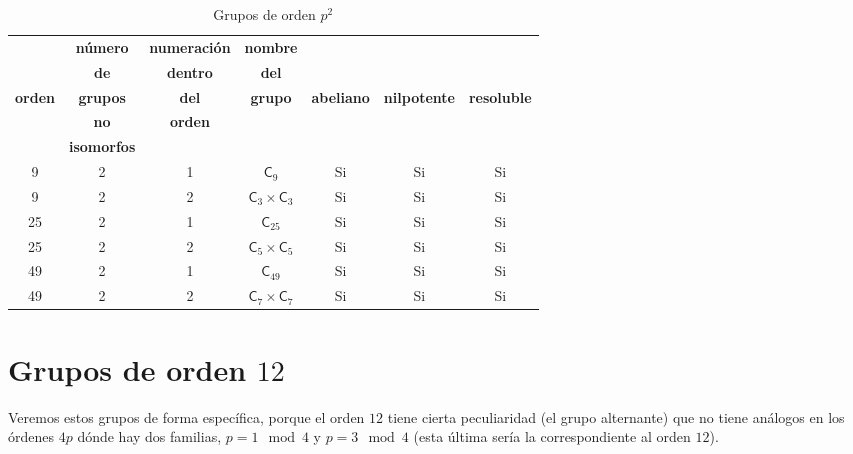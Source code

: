 \documentclass[12pt,a4paper,fleqn,spanish,final,openright]{extbook}
\theoremstyle{definition}
\theoremstyle{remark}
\begin{document}
\begin{table}[h!]
    \begin{center}
        \caption{Grupos de orden $p^2$}
        \label{tab:GruposOrden2p}
        \begin{tabular}{c|c|c|c|c|c|c} %
            \textbf{} & \tiny\textbf{número} &\tiny\textbf{numeración} & \tiny\textbf{nombre} & \textbf{} & {} & {} \\
            \textbf{} & \tiny\textbf{de} &\tiny\textbf{dentro} & \tiny\textbf{del} & \tiny\textbf{} & {} & {} \\
            \tiny\textbf{orden} & \tiny\textbf{grupos} & \tiny\textbf{del} & \tiny\textbf{grupo} & \tiny\textbf{abeliano}  & \tiny\textbf{nilpotente} & \tiny\textbf{resoluble} \\
            \textbf{} & \tiny\textbf{no} & \tiny\textbf{orden} & \textbf{} & \textbf{} & {} & {} \\
            \textbf{} & \tiny\textbf{isomorfos} &\textbf{} & \textbf{} & \textbf{} & {} & {} \\
            \hline
            9 & 2 & 1 & ${\textsf{C}}_{9}$ & Si & Si & Si \\
            \hline
            9 & 2 & 2  & ${{\textsf{C}}_{3}}\times{{\textsf{C}}_{3}}$ & Si & Si & Si \\
            \hline
            25 & 2 & 1 & ${{\textsf{C}}_{25}}$ & Si & Si & Si \\
            \hline
            25 & 2 & 2 & ${{\textsf{C}}_{5}}\times{{\textsf{C}}_{5}}$ & Si & Si & Si \\
            \hline
            49 & 2 & 1 & ${{\textsf{C}}_{49}}$ & Si & Si & Si \\
            \hline
            49 & 2 & 2 & ${{\textsf{C}}_{7}}\times{{\textsf{C}}_{7}}$ & Si & Si & Si \\
            \hline
        \end{tabular}
    \end{center}
\end{table}


\chapter{Grupos de orden $12$}

Veremos estos grupos de forma específica, porque el orden $12$ tiene cierta peculiaridad (el grupo alternante) que no tiene análogos en los órdenes $4p$ dónde hay dos familias, $p=1 \mod 4$ y $p=3\mod 4$ (esta última sería la correspondiente al orden $12$).
\end{document}
